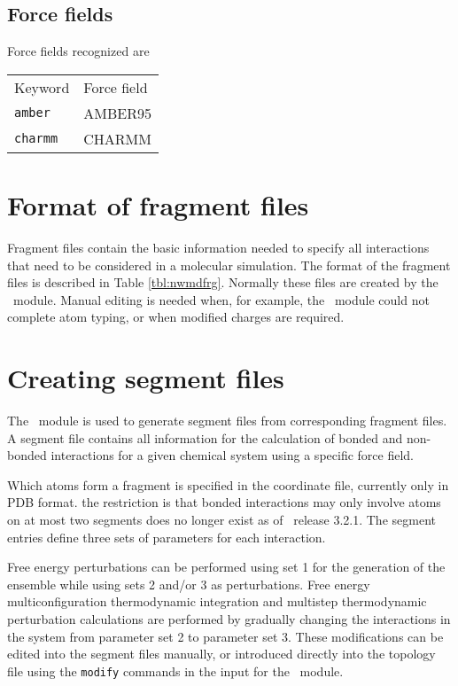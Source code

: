 \subsection{Force fields}
\label{sec:nwaforcefields}
Force fields recognized are
\begin{center}
\begin{tabular}{ll}
\hline
Keyword      & Force field   \\
{\tt amber}  & AMBER95       \\
{\tt charmm} & CHARMM        \\
\hline
\end{tabular}
\end{center}  

\section{Format of fragment files}
Fragment files contain the basic information needed to specify all
interactions that need to be considered in a molecular simulation.
The format of the fragment files is described in Table \ref{tbl:nwmdfrg}.
Normally these files are created by the \prepare\ module. Manual
editing is needed when, for example, the \prepare\ module could not
complete atom typing, or when modified charges are required.

\section{Creating segment files}
\label{sec:nwanwsgm}
The \prepare\ module is used to generate segment files 
from corresponding fragment files. A segment file contains all
information for the calculation of bonded and non-bonded interactions
for a given chemical system using a specific force field.

Which atoms form a fragment is specified in the coordinate file,
currently only in PDB format.
the restriction is that bonded interactions may only involve atoms on at
most two segments does no longer exist as of \nwchem\ release 3.2.1. 
The segment entries define three sets of parameters
for each interaction. 

Free energy perturbations can be performed using set 1 for the 
generation of the ensemble while using sets 2 and/or 3
as perturbations. Free energy multiconfiguration thermodynamic
integration and multistep thermodynamic perturbation calculations are
performed by gradually changing the interactions in the system from
parameter set 2 to parameter set 3. These modifications can be 
edited into the segment files manually, or introduced directly into
the topology file using the \verb+modify+ commands in the input for
the \prepare\ module.

